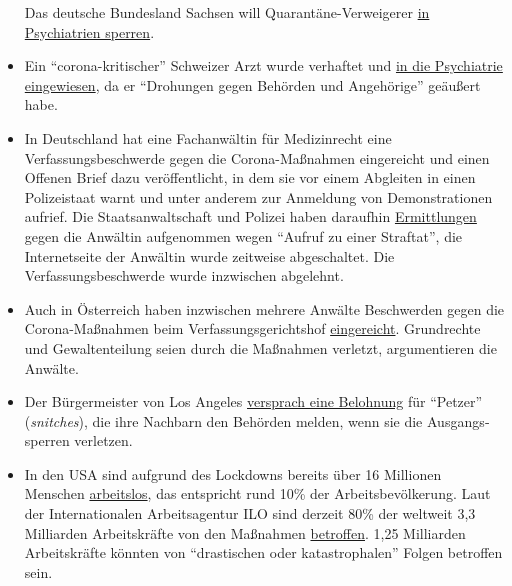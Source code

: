 \begin{itemize}
  Das deutsche Bundesland Sachsen will Quarantäne-Verweigerer
  \href{https://www.welt.de/politik/deutschland/article207198029/Coronavirus-Sachsen-will-Quarantaene-Verweigerer-in-Psychiatrien-sperren.html}{in
  Psychiatrien sperren}.
\item
  Ein ``corona-kritischer'' Schweizer Arzt wurde verhaftet und
  \href{https://www.srf.ch/news/regional/aargau-solothurn/festnahme-von-corona-kritiker-verschwoerung-oder-normale-intervention-der-aargauer-behoerden}{in
  die Psychiatrie eingewiesen}, da er ``Drohungen gegen Behörden und
  Angehörige'' geäußert habe.
\item
  In Deutschland hat eine Fachanwältin für Medizinrecht eine
  Verfassungsbeschwerde gegen die Corona-Maßnahmen eingereicht und einen
  Offenen Brief dazu veröffentlicht, in dem sie vor einem Abgleiten in
  einen Polizeistaat warnt und unter anderem zur Anmeldung von
  Demonstrationen aufrief. Die Staats­anwalt­schaft und Polizei haben
  daraufhin
  \href{https://www.morgenweb.de/mannheimer-morgen_artikel,-coronavirus-aufruf-zu-straftaten-ermittlungen-gegen-heidelberger-rechtsanwaeltin-_arid,1627078.html}{Ermittlungen}
  gegen die Anwältin aufgenommen wegen ``Aufruf zu einer Straftat'', die
  Internetseite der Anwältin wurde zeitweise abgeschaltet. Die
  Verfassungsbeschwerde wurde inzwischen abgelehnt.
\item
  Auch in Österreich haben inzwischen mehrere Anwälte Beschwerden gegen
  die Corona-Maßnahmen beim Verfassungsgerichtshof
  \href{https://wien.orf.at/stories/3043172/}{eingereicht}. Grundrechte
  und Gewaltenteilung seien durch die Maßnahmen verletzt, argumentieren
  die Anwälte.
\item
  Der Bürgermeister von Los Angeles
  \href{https://townhall.com/tipsheet/bethbaumann/2020/04/04/la-mayor-garcetti-says-snitches-get-rewards-for-ratting-out-their-neighbors-n2566348}{versprach
  eine Belohnung} für ``Petzer'' (\emph{snitches}), die ihre Nachbarn
  den Behörden melden, wenn sie die Ausgangs­sperren verletzen.
\item
  In den USA sind aufgrund des Lockdowns bereits über 16 Millionen
  Menschen
  \href{https://www.nytimes.com/2020/04/09/us/coronavirus-us-news.html}{arbeitslos},
  das entspricht rund 10\% der Arbeitsbevölkerung. Laut der
  Internationalen Arbeitsagentur ILO sind derzeit 80\% der weltweit 3,3
  Milliarden Arbeitskräfte von den Maßnahmen
  \href{https://www.ilo.org/global/about-the-ilo/newsroom/news/WCMS_740893/lang--en/index.htm}{betroffen}.
  1,25 Milliarden Arbeitskräfte könnten von ``drastischen oder
  katastrophalen'' Folgen betroffen sein.
\end{itemize}

